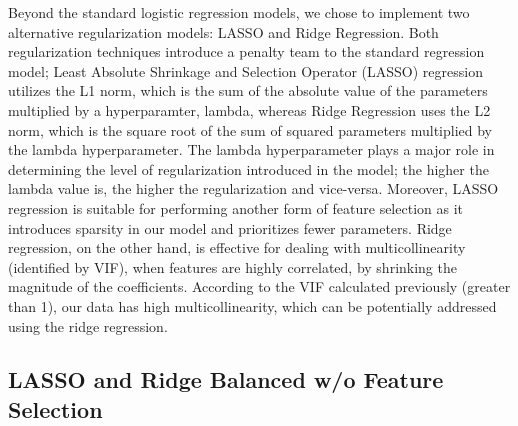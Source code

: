 \documentclass[
]{article}
\begin{document}
Beyond the standard logistic regression models, we chose to implement
two alternative regularization models: LASSO and Ridge Regression. Both
regularization techniques introduce a penalty team to the standard
regression model; Least Absolute Shrinkage and Selection Operator
(LASSO) regression utilizes the L1 norm, which is the sum of the
absolute value of the parameters multiplied by a hyperparamter, lambda,
whereas Ridge Regression uses the L2 norm, which is the square root of
the sum of squared parameters multiplied by the lambda hyperparameter.
The lambda hyperparameter plays a major role in determining the level of
regularization introduced in the model; the higher the lambda value is,
the higher the regularization and vice-versa. Moreover, LASSO regression
is suitable for performing another form of feature selection as it
introduces sparsity in our model and prioritizes fewer parameters. Ridge
regression, on the other hand, is effective for dealing with
multicollinearity (identified by VIF), when features are highly
correlated, by shrinking the magnitude of the coefficients. According to
the VIF calculated previously (greater than 1), our data has high
multicollinearity, which can be potentially addressed using the ridge
regression.

\hypertarget{lasso-and-ridge-balanced-wo-feature-selection}{%
\subsection{LASSO and Ridge Balanced w/o Feature
Selection}\label{lasso-and-ridge-balanced-wo-feature-selection}}
\end{document}
